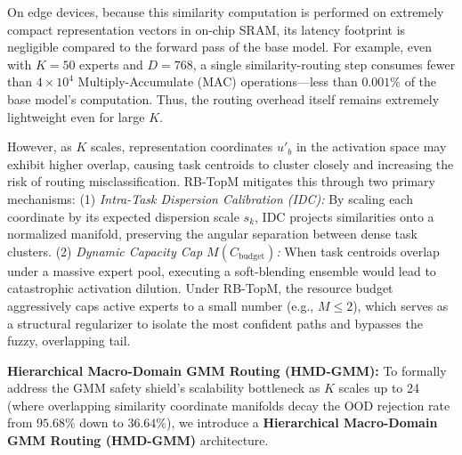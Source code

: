 On edge devices, because this similarity computation is performed on extremely compact representation vectors in on-chip SRAM, its latency footprint is negligible compared to the forward pass of the base model. For example, even with $K = 50$ experts and $D = 768$, a single similarity-routing step consumes fewer than $4 \times 10^4$ Multiply-Accumulate (MAC) operations—less than $0.001\%$ of the base model's computation. Thus, the routing overhead itself remains extremely lightweight even for large $K$.

However, as $K$ scales, representation coordinates $u'_{b}$ in the activation space may exhibit higher overlap, causing task centroids to cluster closely and increasing the risk of routing misclassification. RB-TopM mitigates this through two primary mechanisms:
(1) \emph{Intra-Task Dispersion Calibration (IDC):} By scaling each coordinate by its expected dispersion scale $s_k$, IDC projects similarities onto a normalized manifold, preserving the angular separation between dense task clusters.
(2) \emph{Dynamic Capacity Cap $M(C_{\text{budget}})$:} When task centroids overlap under a massive expert pool, executing a soft-blending ensemble would lead to catastrophic activation dilution. Under RB-TopM, the resource budget aggressively caps active experts to a small number (e.g., $M \le 2$), which serves as a structural regularizer to isolate the most confident paths and bypasses the fuzzy, overlapping tail.

\textbf{Hierarchical Macro-Domain GMM Routing (HMD-GMM):}
To formally address the GMM safety shield's scalability bottleneck as $K$ scales up to 24 (where overlapping similarity coordinate manifolds decay the OOD rejection rate from $95.68\%$ down to $36.64\%$), we introduce a \textbf{Hierarchical Macro-Domain GMM Routing (HMD-GMM)} architecture. 


